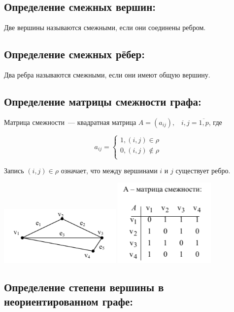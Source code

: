 \documentclass[14pt]{extarticle}
\begin{document}
\subsection{Определение смежных вершин:}

Две вершины называются смежными, если они соединены ребром.

\subsection{Определение смежных рёбер:}

Два ребра называются смежными, если они имеют общую вершину.

\subsection{Определение матрицы смежности графа:}

Матрица смежности~--- квадратная матрица $A = (a_{ij}), \;\;\; i, j = \overline{1, p}$,
где 

\[
    a_{ij} =
    \begin{cases}
        1, (i, j) \in \rho \\
        0, (i, j) \notin \rho\\
    \end{cases}  
\]

Запись $(i, j) \in \rho$ означает, что между вершинами $i$ и $j$ существует 
ребро.

\begin{center}
    \includegraphics[width=60mm]{"3.4.1.png"}
    \includegraphics[width=50mm]{"3.4.2.png"}
\end{center}

\subsection{Определение степени вершины в неориентированном графе:}
\end{document}
